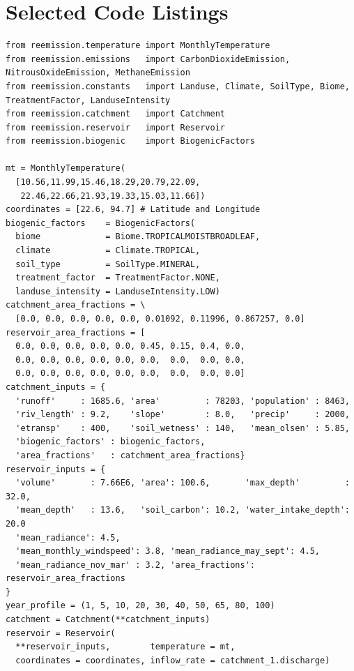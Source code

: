 \documentclass[review, authoryear, 1p]{elsarticle} %
\let\oldappendix\appendix
\renewcommand{\appendix}{%
    \oldappendix
    \setcounter{figure}{0}
    \setcounter{table}{0}
    \setcounter{equation}{0}
    \setcounter{lstlisting}{0}
    
    \renewcommand{\thefigure}{A.\arabic{figure}}
    \renewcommand{\thetable}{A.\arabic{table}}
	\renewcommand{\theequation}{A.\arabic{equation}}
    \renewcommand{\thelstlisting}{A.\arabic{lstlisting}}
  }
\begin{document}
\appendix

\section{Selected Code Listings}
\label{app1}

\begin{minipage}{\textwidth}
\begin{lstlisting}[language=PythonReemission, label={lst:em_calc_setup}, caption={Use of Re-Emission as a library: step-by-step problem formulation.}]
from reemission.temperature import MonthlyTemperature
from reemission.emissions   import CarbonDioxideEmission, NitrousOxideEmission, MethaneEmission
from reemission.constants   import Landuse, Climate, SoilType, Biome, TreatmentFactor, LanduseIntensity
from reemission.catchment   import Catchment
from reemission.reservoir   import Reservoir
from reemission.biogenic    import BiogenicFactors

mt = MonthlyTemperature(
  [10.56,11.99,15.46,18.29,20.79,22.09,
   22.46,22.66,21.93,19.33,15.03,11.66])
coordinates = [22.6, 94.7] # Latitude and Longitude
biogenic_factors    = BiogenicFactors(
  biome             = Biome.TROPICALMOISTBROADLEAF,
  climate           = Climate.TROPICAL,
  soil_type         = SoilType.MINERAL,
  treatment_factor  = TreatmentFactor.NONE,
  landuse_intensity = LanduseIntensity.LOW)
catchment_area_fractions = \
  [0.0, 0.0, 0.0, 0.0, 0.0, 0.01092, 0.11996, 0.867257, 0.0]
reservoir_area_fractions = [
  0.0, 0.0, 0.0, 0.0, 0.0, 0.45, 0.15, 0.4, 0.0, 
  0.0, 0.0, 0.0, 0.0, 0.0, 0.0,  0.0,  0.0, 0.0, 
  0.0, 0.0, 0.0, 0.0, 0.0, 0.0,  0.0,  0.0, 0.0]
catchment_inputs = {
  'runoff'     : 1685.6, 'area'         : 78203, 'population' : 8463, 
  'riv_length' : 9.2,    'slope'        : 8.0,   'precip'     : 2000,   
  'etransp'    : 400,    'soil_wetness' : 140,   'mean_olsen' : 5.85, 
  'biogenic_factors' : biogenic_factors,
  'area_fractions'   : catchment_area_fractions}
reservoir_inputs = {
  'volume'       : 7.66E6, 'area': 100.6,       'max_depth'         : 32.0, 
  'mean_depth'   : 13.6,   'soil_carbon': 10.2, 'water_intake_depth': 20.0
  'mean_radiance': 4.5,    
  'mean_monthly_windspeed': 3.8, 'mean_radiance_may_sept': 4.5, 
  'mean_radiance_nov_mar' : 3.2, 'area_fractions': reservoir_area_fractions
}    
year_profile = (1, 5, 10, 20, 30, 40, 50, 65, 80, 100)
catchment = Catchment(**catchment_inputs)
reservoir = Reservoir(
  **reservoir_inputs,        temperature = mt,
  coordinates = coordinates, inflow_rate = catchment_1.discharge)
\end{lstlisting}
\end{minipage}
\end{document}
